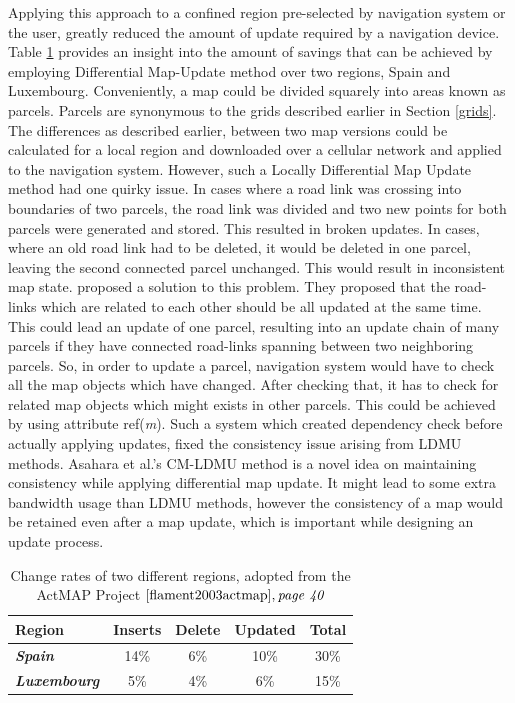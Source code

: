 Applying this approach to a confined region pre-selected by navigation system or the user, greatly reduced the amount of update required by a navigation device. Table \ref{reduction} provides an insight into the amount of savings that can be achieved by employing Differential Map-Update method over two regions, Spain and Luxembourg. Conveniently, a map could be divided squarely into areas known as parcels. Parcels are synonymous to the grids described earlier in Section \ref{grids}. The differences as described earlier, between two map versions could be calculated for a local region and downloaded over a cellular network and applied to the navigation system. However, such a Locally Differential Map Update method had one quirky issue. In cases where a road link was crossing into boundaries of two parcels, the road link was divided and two new points for both parcels were generated and stored. This resulted in broken updates. In cases, where an old road link had to be deleted, it would be deleted in one parcel, leaving the second connected parcel unchanged. This would result in inconsistent map state. \citet{asahara2008locally} proposed a solution to this problem. They proposed that the road-links which are related to each other should be all updated at the same time. This could lead an update of one parcel, resulting into an update chain of many parcels if they have connected road-links spanning between two neighboring parcels. So, in order to update a parcel, navigation system would have to check all the map objects which have changed. After checking that, it has to check for related map objects which might exists in other parcels. This could be achieved by using attribute ref(\textit{m}). Such a system which created dependency check before actually applying updates, fixed the consistency issue arising from LDMU methods. Asahara et al.'s CM-LDMU method is a novel idea on maintaining consistency while applying differential map update. It might lead to some extra bandwidth usage than LDMU methods, however the consistency of a map would be retained even after a map update, which is important while designing an update process.

\begin{table}[]
\centering
\begin{tabular}{|l|c|c|c|c|}
\hline
\textbf{Region}              & \multicolumn{1}{l|}{\textbf{Inserts}} & \multicolumn{1}{l|}{\textbf{Delete}} & \multicolumn{1}{l|}{\textbf{Updated}} & \multicolumn{1}{l|}{\textbf{Total}} \\ \hline
\textit{\textbf{Spain}}      & 14\%                                  & 6\%                                  & 10\%                                  & 30\%                                \\ \hline
\textit{\textbf{Luxembourg}} & 5\%                                   & 4\%                                  & 6\%                                   & 15\%                                \\ \hline
\end{tabular}
\caption{Change rates of two different regions, adopted from the ActMAP Project $\cite{flament2003actmap}, \textit{page 40}$}
\label{reduction}
\end{table}





